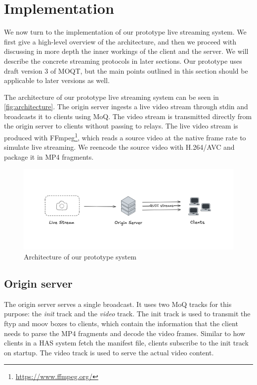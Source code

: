 
\chapter{Implementation}\label{chapter:implementation}
We now turn to the implementation of our prototype live streaming system. We first give a high-level overview of the architecture, and then we proceed with discussing in more depth the inner workings of the client and the server. We will describe the concrete streaming protocols in later sections. Our prototype uses draft version 3 of \ac{MOQT}, but the main points outlined in this section should be applicable to later versions as well.

The architecture of our prototype live streaming system can be seen in \autoref{fig:architecture}. The origin server ingests a live video stream through stdin and broadcasts it to clients using \ac{MoQ}. The video stream is transmitted directly from the origin server to clients without passing to relays. The live video stream is produced with FFmpeg\footnote{\url{https://www.ffmpeg.org/}}, which reads a source video at the native frame rate to simulate live streaming. We reencode the source video with H.264/AVC and package it in MP4 fragments.

\begin{figure}
    \centering
    \includegraphics[width=\textwidth]{figures/architecture.png}
    \caption{Architecture of our prototype system}
    \label{fig:architecture}
\end{figure}

\section{Origin server}
The origin server serves a single broadcast. It uses two \ac{MoQ} tracks for this purpose: the \textit{init} track and the \textit{video} track. The init track is used to transmit the ftyp and moov boxes to clients, which contain the information that the client needs to parse the MP4 fragments and decode the video frames. Similar to how clients in a \ac{HAS} system fetch the manifest file, clients subscribe to the init track on startup. The video track is used to serve the actual video content.

